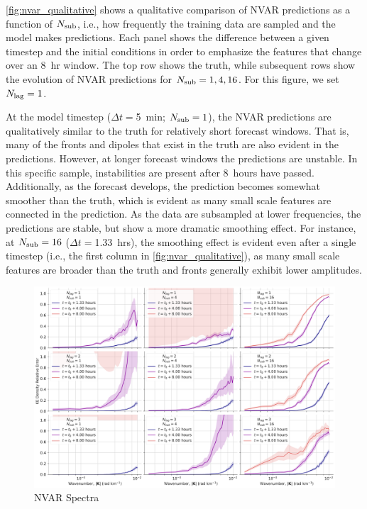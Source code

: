 \cref{fig:nvar_qualitative} shows a qualitative comparison of NVAR predictions
as a function of $N_\text{sub}$, i.e., how frequently the training data are sampled and
the model makes predictions.
Each panel shows the difference between a given timestep and the initial
conditions in order to emphasize the features that change over an 8~hr window.
The top row shows the truth, while subsequent rows show the evolution of NVAR
predictions for $N_\text{sub}=1,4,16$.
For this figure, we set $N_\text{lag}=1$.

At the model timestep ($\Delta t = $5~min; $N_\text{sub}=1$), the NVAR predictions are
qualitatively similar to the truth for relatively short forecast windows.
That is, many of the fronts and dipoles that exist in the truth are also evident
in the predictions.
However, at longer forecast windows the predictions are unstable.
In this specific sample, instabilities are present after 8~hours have passed.
Additionally, as the forecast develops, the prediction becomes somewhat smoother
than the truth, which is evident as many small scale features are connected in
the prediction.
As the data are subsampled at lower frequencies, the predictions are stable, but
show a more dramatic smoothing effect.
For instance, at $N_\text{sub}=16$ ($\Delta t = $1.33~hrs), the smoothing effect is
evident even after a single timestep (i.e., the first column in
\cref{fig:nvar_qualitative}),
as many small scale features are broader than the truth and fronts generally
exhibit lower amplitudes.

\begin{figure}
    \centering
    \includegraphics[width=\textwidth]{../figures/nvar_big_ke_relerr.pdf}
    \caption{NVAR Spectra}
    \label{fig:nvar_spectra}
\end{figure}

